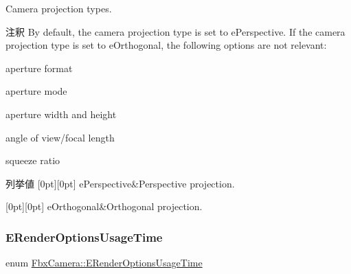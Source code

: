 Camera projection types. \begin{DoxyRemark}{注釈}
By default, the camera projection type is set to e\+Perspective. If the camera projection type is set to e\+Orthogonal, the following options are not relevant\+:
\begin{DoxyItemize}
\item aperture format
\item aperture mode
\item aperture width and height
\item angle of view/focal length
\item squeeze ratio 
\end{DoxyItemize}
\end{DoxyRemark}
\begin{DoxyEnumFields}{列挙値}
[0pt][0pt]{}\mbox{\label{class_fbx_camera_a717b9b0d28c8b20c115edf8c80016fb1aa0ea1fe68c0ac171dae64779456dec9d}} 
e\+Perspective&Perspective projection. \\
\hline

[0pt][0pt]{}\mbox{\label{class_fbx_camera_a717b9b0d28c8b20c115edf8c80016fb1aa04cb9cfd8a05c0406da47338eb62d3d}} 
e\+Orthogonal&Orthogonal projection. \\
\hline

\end{DoxyEnumFields}
\mbox{\label{class_fbx_camera_ad95b8b85dc3f8ab08c8553a089555e1d}} 
\subsubsection{\texorpdfstring{E\+Render\+Options\+Usage\+Time}{ERenderOptionsUsageTime}}
{\footnotesize\ttfamily enum \hyperlink{class_fbx_camera_ad95b8b85dc3f8ab08c8553a089555e1d}{Fbx\+Camera\+::\+E\+Render\+Options\+Usage\+Time}}

